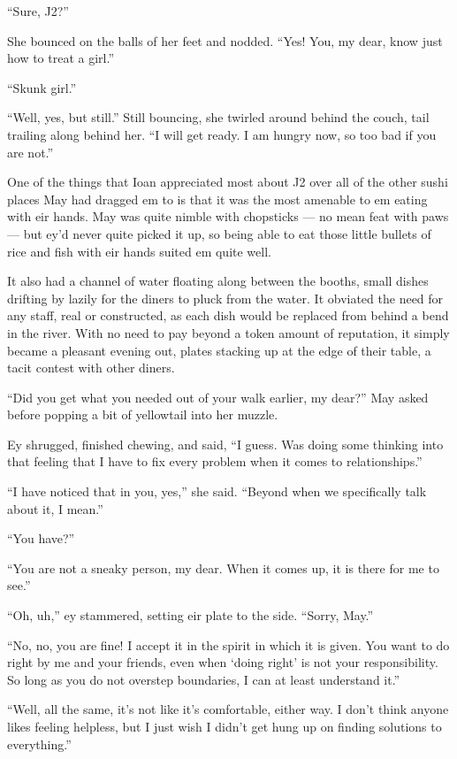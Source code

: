 ``Sure, J2?''

She bounced on the balls of her feet and nodded. ``Yes! You, my dear, know just how to treat a girl.''

``Skunk girl.''

``Well, yes, but still.'' Still bouncing, she twirled around behind the couch, tail trailing along behind her. ``I will get ready. I am hungry now, so too bad if you are not.''

One of the things that Ioan appreciated most about J2 over all of the other sushi places May had dragged em to is that it was the most amenable to em eating with eir hands. May was quite nimble with chopsticks — no mean feat with paws — but ey'd never quite picked it up, so being able to eat those little bullets of rice and fish with eir hands suited em quite well.

It also had a channel of water floating along between the booths, small dishes drifting by lazily for the diners to pluck from the water. It obviated the need for any staff, real or constructed, as each dish would be replaced from behind a bend in the river. With no need to pay beyond a token amount of reputation, it simply became a pleasant evening out, plates stacking up at the edge of their table, a tacit contest with other diners.

``Did you get what you needed out of your walk earlier, my dear?'' May asked before popping a bit of yellowtail into her muzzle.

Ey shrugged, finished chewing, and said, ``I guess. Was doing some thinking into that feeling that I have to fix every problem when it comes to relationships.''

``I have noticed that in you, yes,'' she said. ``Beyond when we specifically talk about it, I mean.''

``You have?''

``You are not a sneaky person, my dear. When it comes up, it is there for me to see.''

``Oh, uh,'' ey stammered, setting eir plate to the side. ``Sorry, May.''

``No, no, you are fine! I accept it in the spirit in which it is given. You want to do right by me and your friends, even when `doing right' is not your responsibility. So long as you do not overstep boundaries, I can at least understand it.''

``Well, all the same, it's not like it's comfortable, either way. I don't think anyone likes feeling helpless, but I just wish I didn't get hung up on finding solutions to everything.''

